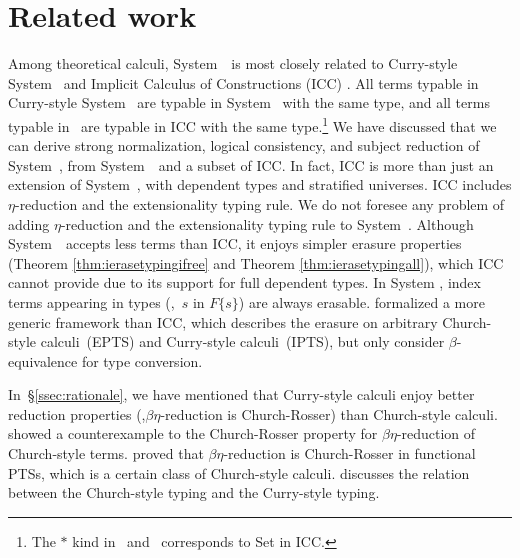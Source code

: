 \section{Related work}
\label{sec:relwork}
Among theoretical calculi, System~\Fi\ is most closely related to
Curry-style System~\Fw \cite{AbeMatUus03,AbeMatUus05,GHR93}
and Implicit Calculus of Constructions (ICC) \cite{Miquel01}.
All terms typable in Curry-style System \Fw\ are typable in System \Fi\ 
with the same type, and all terms typable in \Fi\ are typable in ICC
with the same type.\footnote{The $*$ kind in \Fw\ and \Fi\ corresponds
	to \textsf{Set} in ICC.}
We have discussed that we can derive strong normalization, logical consistency,
and subject reduction of System~\Fi, from System~\Fw\ and a subset of ICC.
In fact, ICC is more than just an extension of System~\Fi, 
with dependent types and stratified universes. ICC includes
$\eta$-reduction
and the extensionality typing rule. We do not foresee any problem of adding
$\eta$-reduction and the extensionality typing rule to System~\Fi. Although
System~\Fi\ accepts less terms than ICC, it enjoys simpler
erasure properties (Theorem \ref{thm:ierasetypingifree} and
Theorem \ref{thm:ierasetypingall}), which ICC cannot provide
due to its support for full dependent types. In System \Fi, index terms
appearing in types (\eg,~$s$ in $F\{s\}$) are always erasable.
\citet{LingerS08} formalized a more generic framework than ICC, which describes
the erasure on arbitrary Church-style calculi~(EPTS) and Curry-style
calculi~(IPTS), but only consider $\beta$-equivalence for type conversion.

In~\S\ref{ssec:rationale}, we have mentioned that Curry-style calculi enjoy
better reduction properties (\eg,$\beta\eta$-reduction is Church-Rosser)
than Church-style calculi. \citet{Nederpelt73} showed a counterexample to
the Church-Rosser property for $\beta\eta$-reduction of Church-style terms.
\citet{Geuvers92} proved that $\beta\eta$-reduction is Church-Rosser
in functional PTSs, which is a certain class of Church-style calculi.
\citet{Seldin08} discusses the relation between the Church-style typing
and the Curry-style typing.

